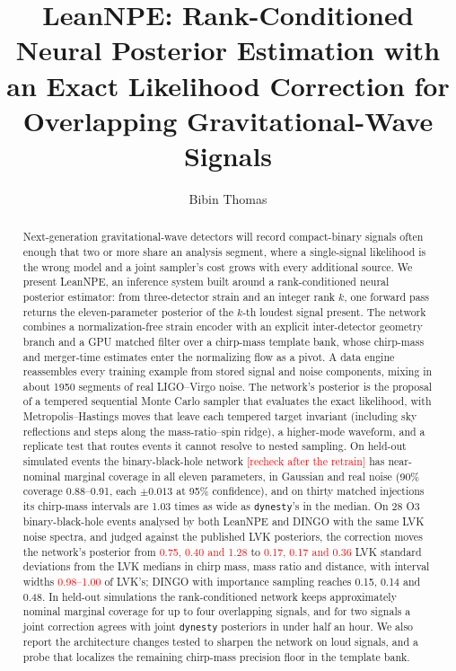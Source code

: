 \documentclass[twocolumn,linenumbers]{aastex701}
\newcommand{\pending}[1]{\textcolor{red}{#1}}
\begin{document}
\title{LeanNPE: Rank-Conditioned Neural Posterior Estimation with an Exact Likelihood Correction for Overlapping Gravitational-Wave Signals}

\author{Bibin Thomas}

\begin{abstract}
Next-generation gravitational-wave detectors will record compact-binary
signals often enough that two or more share an analysis segment, where a
single-signal likelihood is the wrong model and a joint sampler's cost grows
with every additional source. We present LeanNPE, an inference system built
around a rank-conditioned neural posterior estimator: from three-detector
strain and an integer rank $k$, one forward pass returns the eleven-parameter
posterior of the $k$-th loudest signal present. The network combines a
normalization-free strain encoder with an explicit inter-detector geometry
branch and a GPU matched filter over a chirp-mass template bank, whose
chirp-mass and merger-time estimates enter the normalizing flow as a pivot.
A data engine reassembles every training example from stored signal and noise
components, mixing in about 1950 segments of real LIGO--Virgo noise. The
network's posterior is the proposal of a tempered sequential Monte Carlo
sampler that evaluates the exact likelihood, with Metropolis--Hastings moves
that leave each tempered target invariant (including sky reflections and steps
along the mass-ratio--spin ridge), a higher-mode waveform, and a replicate test
that routes events it cannot resolve to nested sampling. On held-out simulated events the
binary-black-hole network \pending{[recheck after the retrain]} has near-nominal marginal coverage in all eleven parameters, in
Gaussian and real noise (90\% coverage 0.88--0.91, each $\pm0.013$ at 95\% confidence), and on thirty matched
injections its chirp-mass intervals are 1.03 times as wide as
\texttt{dynesty}'s in the median. On 28 O3 binary-black-hole events analysed
by both LeanNPE and DINGO with the same LVK noise spectra, and judged against
the published LVK posteriors, the correction moves the network's posterior from
\pending{0.75, 0.40 and 1.28} to \pending{0.17, 0.17 and 0.36} LVK standard deviations from the LVK
medians in chirp mass, mass ratio and distance, with interval widths
\pending{0.98--1.00} of LVK's; DINGO with importance sampling reaches 0.15, 0.14 and
0.48. In held-out simulations the rank-conditioned network keeps approximately
nominal marginal coverage for up to four overlapping signals, and for two
signals a joint correction agrees with joint \texttt{dynesty} posteriors in
under half an hour. We also report the architecture changes
tested to sharpen the network on loud signals, and a probe that localizes the
remaining chirp-mass precision floor in the template bank.
\end{abstract}
\end{document}
